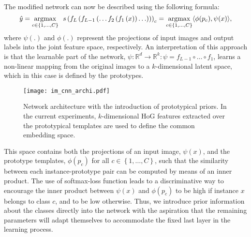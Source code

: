 \documentclass{bmvc2k}
\newcommand{\R}{\mathbb{R}}
\begin{document}
The modified network can now be described using the following formula:
\begin{equation}
\hat{y}=\operatornamewithlimits{argmax}_{c \in \{1,\ldots,C\}}\enspace
s\left(f_{L}\left(f_{L-1}\left(\ldots
f_{2}\left(f_{1}\left(x\right)\right)\ldots\right)\right)\right)_c =
\operatornamewithlimits{argmax}_{c\in\{1,\ldots,C\}} \langle\phi(p_c),
\psi(x)\rangle,
\label{eq:CNN2}
\end{equation}
where $\psi(.)$ and $\phi(.)$ represent the projections of input images and
output labels into the joint feature space, respectively. An interpretation of this approach is that 
the learnable part of the network,
$\psi : \R^{d} \to \R^{k}: \psi=f_{L-1}\circ\ldots\circ f_{1}$,
learns a non-linear mapping from the original images to a $k$-dimensional
latent space, which in this case is defined by the prototypes. 
\begin{figure}
  \centering
  \texttt{[image: im\_cnn\_archi.pdf]}
\caption{\label{fig:network_arch}Network architecture with the introduction
  of prototypical priors. In the current experiments, $k$-dimensional HoG
  features extracted over the prototypical templates are used to define the
  common embedding space.}
\end{figure}
This space contains both the projections of an input image, $\psi(x)$, and the
prototype templates, $\phi(p_{c})$ for all $c\in\left\{ 1,\ldots ,C\right\} $,
such that the similarity between each instance-prototype pair can be computed by means of an inner product.
The use of softmax-loss function leads to a discriminative way to encourage the inner product 
between $\psi(x)$ and $\phi(p_{c})$ to be high if instance $x$ belongs to class
$c$, and to be low otherwise. Thus, we introduce prior
information about the classes directly into the network with the aspiration that the remaining parameters
will adapt themselves to accommodate the fixed last layer in the learning process.

\end{document}
